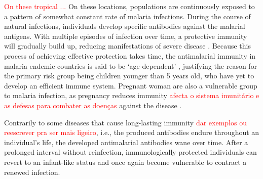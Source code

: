 \textcolor{red}{On these tropical ...} On these locations, populations are continuously exposed to a pattern of somewhat constant rate of malaria infections.
During the course of natural infections, individuals develop specific antibodies against the malarial antigens.
With multiple episodes of infection over time, a protective immunity will gradually build up, reducing manifestations of severe disease \cite{perlmann2002malaria}.
Because this process of achieving effective protection takes time, the antimalarial immunity in malaria endemic countries is said to be `age-dependent' \cite{ondigo2014estimation}, justifying the reason for the primary risk group being children younger than 5 years old, who have yet to develop an efficient immune system.
Pregnant woman are also a vulnerable group to malaria infection, as pregnancy reduces immunity \textcolor{red}{afecta o sistema imunitário e as defesas para combater as doenças} against the disease \cite{who2017world, carter2002evolutionary}.

Contrarily to some diseases that cause long-lasting immunity \textcolor{red}{dar exemplos ou reescrever pra ser mais ligeiro}, i.e., the produced antibodies endure throughout an individual's life, the developed antimalarial antibodies wane over time.
After a prolonged interval without reinfection, immunologically protected individuals can revert to an infant-like status and once again become vulnerable to contract a renewed infection.

